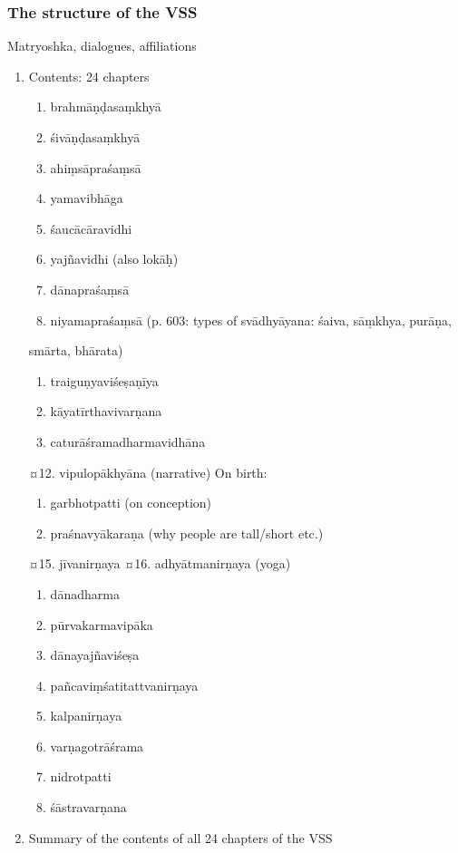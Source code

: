 \documentclass[11pt]{article}
\begin{document}
\subsubsection{The structure of the VSS}
\label{sec:org03981d2}
Matryoshka, dialogues, affiliations
\begin{enumerate}
\item Contents:
\label{sec:org76141ca}
24 chapters

\begin{enumerate}
\item brahmāṇḍasaṃkhyā
\item śivāṇḍasaṃkhyā
\item ahiṃsāpraśaṃsā
\item yamavibhāga
\item śaucācāravidhi
\item yajñavidhi (also lokāḥ)
\item dānapraśaṃsā
\item niyamapraśaṃsā (p. 603: types of svādhyāyana: śaiva, sāṃkhya, purāṇa,
\end{enumerate}
smārta, bhārata)
\begin{enumerate}
\item traiguṇyaviśeṣaṇīya
\item kāyatīrthavivarṇana
\item caturāśramadharmavidhāna
\end{enumerate}
¤12. vipulopākhyāna  (narrative)
On birth:
\begin{enumerate}
\item garbhotpatti (on conception)
\item praśnavyākaraṇa (why people are tall/short etc.)
\end{enumerate}
¤15. jīvanirṇaya 
¤16. adhyātmanirṇaya (yoga) 
\begin{enumerate}
\item dānadharma
\item pūrvakarmavipāka
\item dānayajñaviśeṣa
\item pañcaviṃśatitattvanirṇaya
\item kalpanirṇaya
\item varṇagotrāśrama
\item nidrotpatti
\item śāstravarṇana
\end{enumerate}

\item Summary of the contents of all 24 chapters of the VSS
\label{sec:org3d61159}
\end{enumerate}
\end{document}
